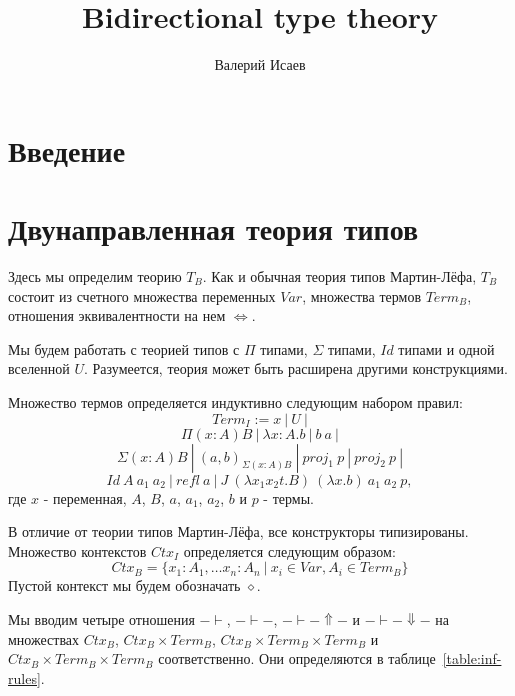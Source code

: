 \documentclass{amsart}
\theoremstyle{definition}
\theoremstyle{remark}
\newcommand{\deq}{\Leftrightarrow}
\numberwithin{figure}{section}
\begin{document}
\title{Bidirectional type theory}

\author{Валерий Исаев}


\maketitle

\section{Введение}

\section{Двунаправленная теория типов}

Здесь мы определим теорию $T_B$.
Как и обычная теория типов Мартин-Лёфа, $T_B$ состоит из счетного множества переменных $Var$, множества термов $Term_B$, отношения эквивалентности на нем $\deq$.

Мы будем работать с теорией типов с $\Pi$ типами, $\Sigma$ типами, $Id$ типами и одной вселенной $U$.
Разумеется, теория может быть расширена другими конструкциями.

Множество термов определяется индуктивно следующим набором правил:
\[ Term_I := x\ |\ U\ | \]
\[ \Pi (x : A) B\ |\ \lambda x : A. b\ |\ b\ a\ | \]
\[ \Sigma (x : A) B\ |\ (a, b)_{\Sigma (x : A) B}\ |\ proj_1\ p\ |\ proj_2\ p\ | \]
\[ Id\ A\ a_1\ a_2\ |\ refl\ a\ |\ J\ (\lambda x_1 x_2 t. B)\ (\lambda x. b)\ a_1\ a_2\ p, \]
где $x$ - переменная, $A$, $B$, $a$, $a_1$, $a_2$, $b$ и $p$ - термы.

В отличие от теории типов Мартин-Лёфа, все конструкторы типизированы.
Множество контекстов $Ctx_I$ определяется следующим образом:
\[ Ctx_B = \{ x_1 : A_1, \ldots x_n : A_n\ |\ x_i \in Var, A_i \in Term_B \} \]
Пустой контекст мы будем обозначать $\diamond$.

Мы вводим четыре отношения $- \vdash$, $- \vdash -$, $- \vdash - \Uparrow -$ и $- \vdash - \Downarrow -$ на множествах $Ctx_B$, $Ctx_B \times Term_B$, $Ctx_B \times Term_B \times Term_B$ и $Ctx_B \times Term_B \times Term_B$ соответственно.
Они определяются в таблице~\ref{table:inf-rules}.
\end{document}

